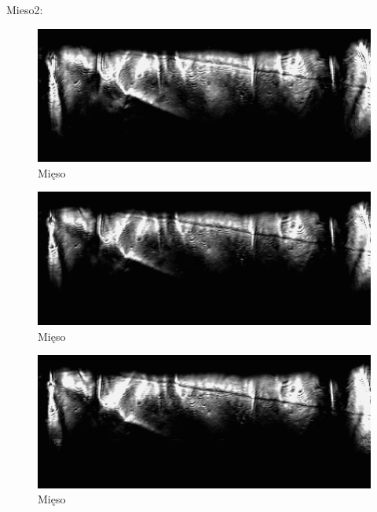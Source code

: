 \documentclass[a4paper,12pt]{article}
\begin{document}
Mieso2:

\begin{figure} [H]
  \begin{center}
    \includegraphics[width = 15cm]{data/2MIES0.png}
    \caption{Mięso}
  \end{center}
\end{figure}

\begin{figure} [H]
  \begin{center}
    \includegraphics[width = 15cm]{data/2MIES1.png}
    \caption{Mięso}
  \end{center}
\end{figure}


\begin{figure} [H]
  \begin{center}
    \includegraphics[width = 15cm]{data/2MIES2.png}
    \caption{Mięso}
  \end{center}
\end{figure}
\end{document}
